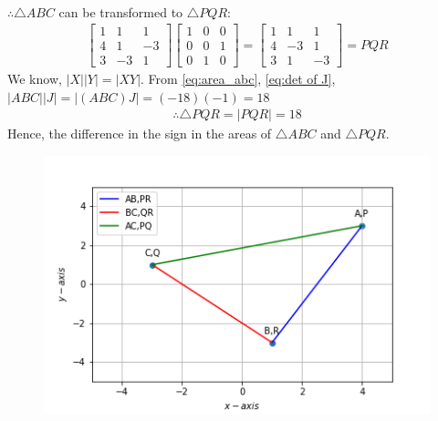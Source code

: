 \documentclass[journal,12pt,twocolumn]{IEEEtran}
\renewcommand\thesection{\arabic{section}}
\begin{document}
\begin{enumerate}[label=\thesection.\arabic*.,ref=\thesection.\theenumi]
\begin{align}
\end{align}
$\therefore\triangle ABC$ can be transformed to $\triangle PQR$:
\begin{align}
\begin{bmatrix}
1 & 1 & 1 \\ 
4 & 1 & -3\\ 
3 & -3 & 1
\end{bmatrix}\begin{bmatrix}
1 & 0 & 0\\ 
0 & 0 & 1\\ 
0 & 1 & 0 
\end{bmatrix}=\begin{bmatrix}
1 & 1 & 1\\ 
4 & -3 & 1\\ 
3 & 1 & -3
\end{bmatrix}=PQR
\end{align}
We know, $\left | X \right |\left | Y \right |=\left | XY \right |$. From \eqref{eq:area_abc}, \eqref{eq:det of J}, \\
$\left | ABC \right |\left | J \right |=\left | (ABC)J \right |=(-18)(-1)=18$
\label{eq:area_pqr}
\begin{align}
\therefore\triangle PQR=\left | PQR \right |=18
\end{align}
Hence, the difference in the sign in the areas of $\triangle ABC$ and $\triangle PQR$.
\begin{figure}[!ht]
	\centering
	\includegraphics[scale=0.5]{triangle.png}
\end{figure}
\end{enumerate}
\end{document}
